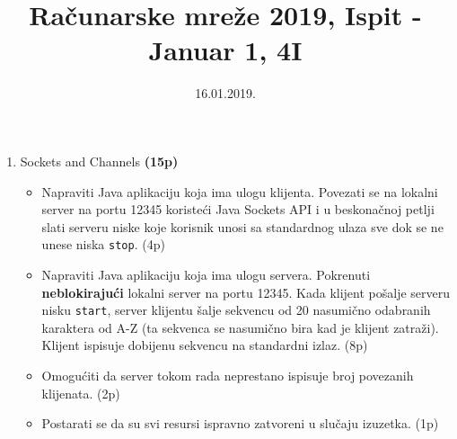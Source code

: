 \documentclass[]{article}
\title{Ra\v{c}unarske mre\v{z}e 2019, Ispit - Januar 1, 4I}
\author{}
\date{16.01.2019.}
\begin{document}
\maketitle

\begin{enumerate}
  \item Sockets and Channels \textbf{(15p)}
  \begin{itemize}
    \item Napraviti Java aplikaciju koja ima ulogu klijenta. Povezati se na lokalni server na portu 12345 koriste\'c{}i Java Sockets API i u beskona\v{c}noj petlji slati serveru niske koje korisnik unosi sa standardnog ulaza sve dok se ne unese niska \texttt{stop}. \hfill (4p)
    \item Napraviti Java aplikaciju koja ima ulogu servera. Pokrenuti \textbf{neblokiraju\'c{}i} lokalni server na portu 12345. Kada klijent po\v{s}alje serveru nisku \texttt{start}, server klijentu \v{s}alje sekvencu od 20 nasumi\v{c}no odabranih karaktera od A-Z (ta sekvenca se nasumi\v{c}no bira kad je klijent zatra\v{z}i). Klijent ispisuje dobijenu sekvencu na standardni izlaz. \hfill (8p)
    \item Omogu\'c{}iti da server tokom rada neprestano ispisuje broj povezanih klijenata. \hfill (2p)
    \item Postarati se da su svi resursi ispravno zatvoreni u slu\v{c}aju izuzetka. \hfill (1p)
  \end{itemize}


\end{enumerate}
\end{document}
